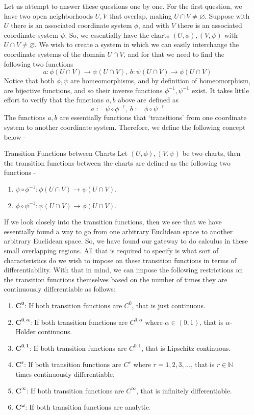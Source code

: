 Let us attempt to answer these questions one by one. For the first question, we have two open neighborhoods $U,V$ that overlap, making $U\cap V\neq\varnothing$. Suppose with $U$ there is an associated coordinate system $\phi$, and with $V$ there is an associated coordinate system $\psi$. So, we essentially have the charts $(U,\phi),(V,\psi)$ with $U\cap V\neq\varnothing$. We wish to create a system in which we can easily interchange the coordinate systems of the domain $U\cap V$, and for that we need to find the following two functions $$ a:\phi(U\cap V)\to\psi(U\cap V),\ b:\psi(U\cap V)\to\phi(U\cap V) $$ Notice that both $\phi,\psi$ are homeomorphisms, and by definition of homeomorphism, are bijective functions, and so their inverse functions $\phi^{-1},\psi^{-1}$ exist. It takes little effort to verify that the functions $a,b$ above are defined as $$a:=\psi\circ\phi^{-1},\ b:=\phi\circ\psi^{-1}$$ The functions $a,b$ are essentially functions that `transitions' from one coordinate system to another coordinate system. Therefore, we define the following concept below -
\begin{Definition}{Transition Functions between Charts}\label{transition_functions}
	Let $(U,\phi),(V,\psi)$ be two charts, then the transition functions between the charts are defined as the following two functions -
	\begin{enumerate}
		\item $\psi\circ\phi^{-1}:\phi(U\cap V)\to\psi(U\cap V)$.
		\item $\phi\circ\psi^{-1}:\psi(U\cap V)\to\phi(U\cap V)$.
	\end{enumerate}
\end{Definition}
\noindent If we look closely into the transition functions, then we see that we have essentially found a way to go from one arbitrary Euclidean space to another arbitrary Euclidean space. So, we have found our gateway to do calculus in these small overlapping regions. All that is required to specify is what sort of characteristics do we wish to impose on these transition functions in terms of differentiability. With that in mind, we can impose the following restrictions on the transition functions themselves based on the number of times they are continuously differentiable as follows:
\begin{enumerate}
	\item $\pmb{C^0}$: If both transition functions are $C^0$, that is just continuous.
	\item $\pmb{C^{0,\alpha}}$: If both transition functions are $C^{0,\alpha}$ where $\alpha\in(0,1)$, that is $\alpha$-Hölder continuous.
	\item $\pmb{C^{0,1}}$: If both transition functions are $C^{0,1}$, that is Lipschitz continuous.
	\item $\pmb{C^r}$: If both transition functions are $C^r$ where $r=1,2,3,\dots$, that is $r\in\mathbb{N}$ times continuously differentiable.
	\item $\pmb{C^{\infty}}$: If both transition functions are $C^{\infty}$, that is infinitely differentiable.
	\item $\pmb{C^{\omega}}$: If both transition functions are analytic.
\end{enumerate}
